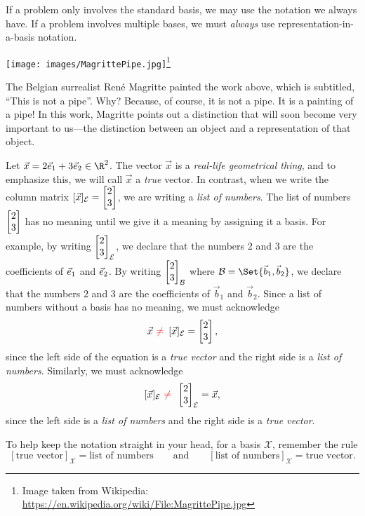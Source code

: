 \begin{emphbox}[Takeaway]
	If a problem only involves the standard basis, we may use the notation we always have. If a problem involves
	multiple bases, we must \emph{always} use representation-in-a-basis notation.
\end{emphbox}



\begin{center}
\texttt{[image: images/MagrittePipe.jpg]}\footnote{ Image taken from Wikipedia: \url{https://en.wikipedia.org/wiki/File:MagrittePipe.jpg}} 
\end{center}
The Belgian surrealist Ren\'e Magritte painted the work above, which is subtitled, ``This is not a pipe''. Why? Because, of course, it is not
a pipe. It is a painting of a pipe! In this work, Magritte points out a distinction that will soon become very important to
us---the distinction between an object and a representation of that object.

\bigskip

Let $\vec x=2\xhat+3\yhat\in \R^2$. The vector $\vec x$ is a \emph{real-life geometrical thing}, and to
emphasize this, we will call $\vec x$ a \emph{true} vector. In contrast, when we write
the column matrix $[\vec x]_{\mathcal E}=\mat{2\\3}$, we are writing a \emph{list of numbers}. The list of
numbers $\mat{2\\3}$ has no meaning until we give it a meaning by assigning it a basis. For example,
by writing $\mat{2\\3}_{\mathcal E}$, we declare that the numbers $2$ and $3$ are the coefficients of ${\vec e_1}$ and
${\vec e_2}$. By writing $\mat{2\\3}_{\mathcal B}$ where $\mathcal B=\Set{\vec b_1,\vec b_2}$,
we declare that the numbers $2$ and $3$ are the coefficients of $\vec b_1$ and $\vec b_2$. Since a list of numbers
without a basis has no meaning, we must acknowledge
\[
	\vec x\,\,{\color{Red}\neq}\,\,\, [\vec x]_{\mathcal E}=\mat{2\\3},
\]
since the left side of the equation is a \emph{true vector} and the right side is a \emph{list of numbers}. Similarly,
we must acknowledge
\[
	[\vec x]_{\mathcal E}\,\,{\color{Red}\neq}\,\,\, \mat{2\\3}_{\mathcal E}=\vec x,
\]
since the left side is a \emph{list of numbers} and the right side is a \emph{true vector}.

To help keep the notation straight in your head, for a basis $\mathcal X$, remember the rule
\[
	[\text{true vector}]_{\mathcal X} = \text{list of numbers}\qquad\text{and}\qquad
	[\text{list of numbers}]_{\mathcal X} =\text{true vector}.
\]

